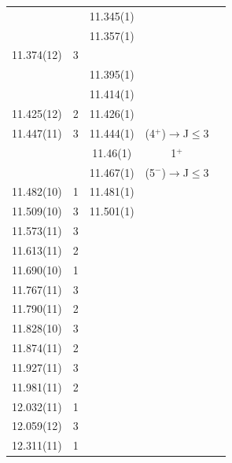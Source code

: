 \begin{center}
\begin{longtable}{cc cc c}
                       &          & 11.345(1)   &                               &               \\
                       &          & 11.357(1)   &                               &               \\
    11.374(12)         & 3        &             &                               &               \\
                       &          & 11.395(1)   &                               &               \\
                       &          & 11.414(1)   &                               &               \\
    11.425(12)         & 2        & 11.426(1)   &                               &               \\
    11.447(11)         & 3        & 11.444(1)   & (4$^+$)$\rightarrow$J$\leq$3  &               \\
                       &          & 11.46(1)    &        1$^+$                  &               \\
                       &          & 11.467(1)   & (5$^-$)$\rightarrow$J$\leq$3  &               \\
    11.482(10)         & 1        & 11.481(1)   &                               &               \\
    11.509(10)         & 3        & 11.501(1)   &                               &               \\
     11.573(11)        & 3        &             &                               &               \\
     11.613(11)        & 2        &             &                               &               \\
   11.690(10)          & 1        &             &                               &               \\
   11.767(11)          & 3        &             &                               &               \\
   11.790(11)          & 2        &             &                               &               \\
   11.828(10)          & 3        &             &                               &               \\
     11.874(11)        & 2        &             &                               &               \\
    11.927(11)         & 3        &             &                               &               \\
    11.981(11)         & 2        &             &                               &               \\
     12.032(11)        & 1        &             &                               &               \\
     12.059(12)        & 3        &             &                               &               \\
    12.311(11)         & 1        &             &                               &               \\





\end{longtable}
\end{center}
